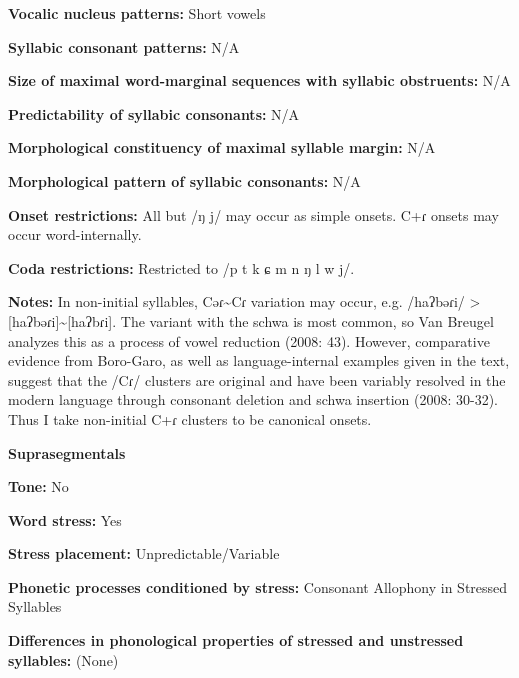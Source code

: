 \textbf{Vocalic nucleus patterns:} Short vowels



\textbf{Syllabic consonant patterns:} N/A



\textbf{Size of maximal word{}-marginal sequences with syllabic obstruents:} N/A



\textbf{Predictability of syllabic consonants:} N/A



\textbf{Morphological constituency of maximal syllable margin:} N/A



\textbf{Morphological pattern of syllabic consonants:} N/A



\textbf{Onset restrictions:} All but /ŋ j/ may occur as simple onsets. C+ɾ onsets may occur word-internally.



\textbf{Coda restrictions:} Restricted to /p t k ɕ m n ŋ l w j/. 



\textbf{Notes:} In non-initial syllables, Cəɾ{\textasciitilde}Cɾ variation may occur, e.g. /haʔbəɾi/ > [haʔbəɾi]{\textasciitilde}[haʔbɾi]. The variant with the schwa is most common, so Van Breugel analyzes this as a process of vowel reduction (2008: 43). However, comparative evidence from Boro-Garo, as well as language-internal examples given in the text, suggest that the /Cɾ/ clusters are original and have been variably resolved in the modern language through consonant deletion and schwa insertion (2008: 30-32). Thus I take non-initial C+ɾ clusters to be canonical onsets.



\textbf{Suprasegmentals}



\textbf{Tone:} No



\textbf{Word stress:} Yes



\textbf{Stress placement:} Unpredictable/Variable



\textbf{Phonetic processes conditioned by stress:} Consonant Allophony in Stressed Syllables



\textbf{Differences in phonological properties of stressed and unstressed syllables:} (None)



